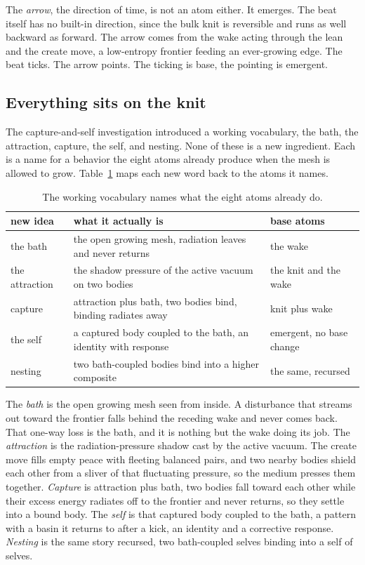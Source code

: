 The \emph{arrow}, the direction of time, is not an atom either. It emerges. The beat itself has no built-in direction, since the bulk knit is reversible and runs as well backward as forward. The arrow comes from the wake acting through the lean and the create move, a low-entropy frontier feeding an ever-growing edge. The beat ticks. The arrow points. The ticking is base, the pointing is emergent.

\subsection{Everything sits on the knit}

The capture-and-self investigation introduced a working vocabulary, the bath, the attraction, capture, the self, and nesting. None of these is a new ingredient. Each is a name for a behavior the eight atoms already produce when the mesh is allowed to grow. Table~\ref{tab:vocabulary-to-atoms} maps each new word back to the atoms it names.

\begin{table}[ht]
\centering
\begin{tabular}{@{}lll@{}}
\toprule
new idea & what it actually is & base atoms \\
\midrule
the bath & the open growing mesh, radiation leaves and never returns & the wake \\
the attraction & the shadow pressure of the active vacuum on two bodies & the knit and the wake \\
capture & attraction plus bath, two bodies bind, binding radiates away & knit plus wake \\
the self & a captured body coupled to the bath, an identity with response & emergent, no base change \\
nesting & two bath-coupled bodies bind into a higher composite & the same, recursed \\
\bottomrule
\end{tabular}
\caption{The working vocabulary names what the eight atoms already do.}
\label{tab:vocabulary-to-atoms}
\end{table}

The \emph{bath} is the open growing mesh seen from inside. A disturbance that streams out toward the frontier falls behind the receding wake and never comes back. That one-way loss is the bath, and it is nothing but the wake doing its job. The \emph{attraction} is the radiation-pressure shadow cast by the active vacuum. The create move fills empty peace with fleeting balanced pairs, and two nearby bodies shield each other from a sliver of that fluctuating pressure, so the medium presses them together. \emph{Capture} is attraction plus bath, two bodies fall toward each other while their excess energy radiates off to the frontier and never returns, so they settle into a bound body. The \emph{self} is that captured body coupled to the bath, a pattern with a basin it returns to after a kick, an identity and a corrective response. \emph{Nesting} is the same story recursed, two bath-coupled selves binding into a self of selves.

